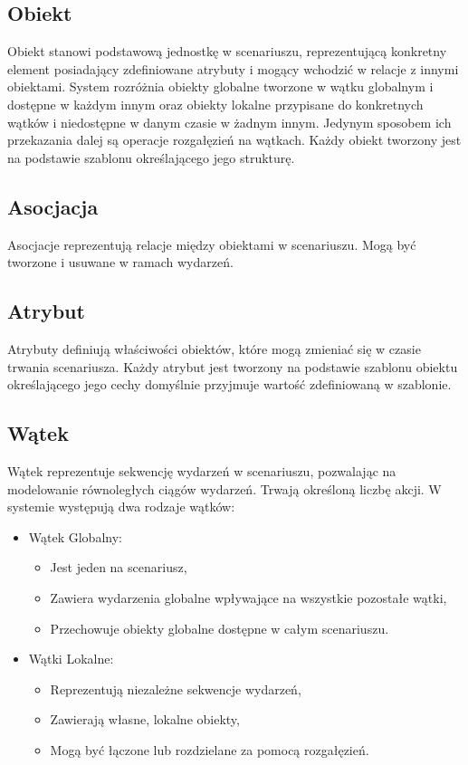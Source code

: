 \subsection{Obiekt}

Obiekt stanowi podstawową jednostkę w scenariuszu, reprezentującą konkretny element posiadający zdefiniowane atrybuty i 
mogący wchodzić w relacje z innymi obiektami. System rozróżnia obiekty globalne tworzone w wątku globalnym i dostępne w każdym 
innym oraz obiekty lokalne przypisane do konkretnych wątków i niedostępne w danym czasie w żadnym innym. 
Jedynym sposobem ich przekazania dalej są operacje rozgałęzień na wątkach.
Każdy obiekt tworzony jest na podstawie szablonu określającego jego strukturę.

\subsection{Asocjacja}

Asocjacje reprezentują relacje między obiektami w scenariuszu. Mogą być tworzone i usuwane w ramach wydarzeń.

\subsection{Atrybut}

Atrybuty definiują właściwości obiektów, które mogą zmieniać się w czasie trwania scenariusza. Każdy atrybut jest tworzony 
na podstawie szablonu obiektu określającego jego cechy domyślnie przyjmuje wartość zdefiniowaną w szablonie.

\subsection{Wątek}

Wątek reprezentuje sekwencję wydarzeń w scenariuszu, pozwalając na modelowanie równoległych ciągów wydarzeń. 
Trwają określoną liczbę akcji. W systemie występują dwa rodzaje wątków:
\begin{itemize}
    \item Wątek Globalny:
    \begin{itemize}
        \item Jest jeden na scenariusz,
        \item Zawiera wydarzenia globalne wpływające na wszystkie pozostałe wątki,
        \item Przechowuje obiekty globalne dostępne w całym scenariuszu.
    \end{itemize}
    \item Wątki Lokalne:
    \begin{itemize}
        \item Reprezentują niezależne sekwencje wydarzeń,
        \item Zawierają własne, lokalne obiekty,
        \item Mogą być łączone lub rozdzielane za pomocą rozgałęzień.
    \end{itemize}
\end{itemize}

